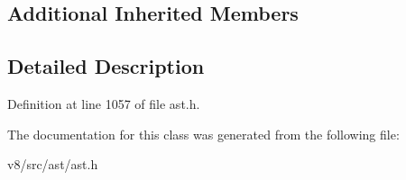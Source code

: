 \subsection*{Additional Inherited Members}


\subsection{Detailed Description}


Definition at line 1057 of file ast.\+h.



The documentation for this class was generated from the following file\+:\begin{DoxyCompactItemize}
\item 
v8/src/ast/ast.\+h\end{DoxyCompactItemize}
